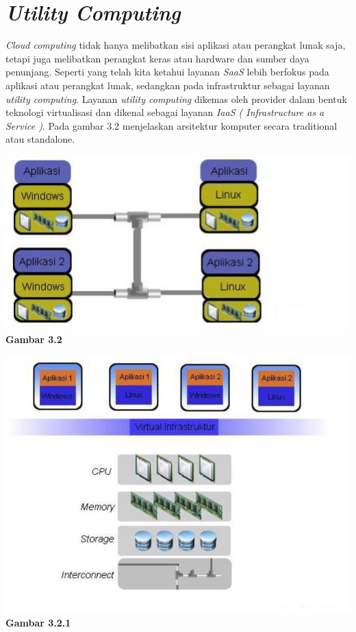 \section{\textit{Utility Computing}}
\tab \textit{Cloud computing} tidak hanya melibatkan sisi aplikasi atau perangkat lunak saja, tetapi juga melibatkan perangkat keras atau hardware dan sumber daya penunjang. Seperti yang telah kita ketahui layanan \textit{SaaS} lebih berfokus pada aplikasi atau perangkat lunak, sedangkan pada infrastruktur sebagai layanan \textit{utility computing}. Layanan \textit{utility computing} dikemas oleh provider dalam bentuk teknologi virtualisasi dan dikenal sebagai layanan \textit{IaaS ( Infrastructure as a Service )}. Pada gambar 3.2 menjelaskan arsitektur komputer secara traditional atau standalone.\\
\begin{center}
\includegraphics[scale=1]{Gambar32.jpg} \\
\textbf{Gambar 3.2}
\end{center}
\begin{center}
\includegraphics[scale=1]{Gambar321.jpg} \\
\textbf{Gambar 3.2.1}
\end{center}
